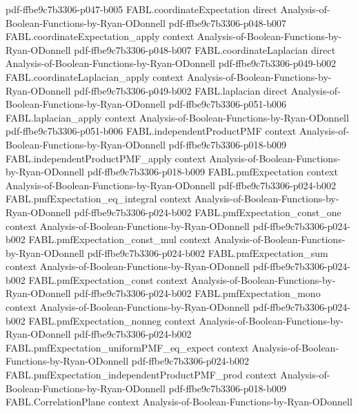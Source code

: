 \begin{theorem}
  {pdf-ffbe9c7b3306-p047-b005}
\proofstep
  {FABL.coordinateExpectation}
  {direct}
  {Analysis-of-Boolean-Functions-by-Ryan-ODonnell}
  {pdf-ffbe9c7b3306-p048-b007}
\proofstep
  {FABL.coordinateExpectation_apply}
  {context}
  {Analysis-of-Boolean-Functions-by-Ryan-ODonnell}
  {pdf-ffbe9c7b3306-p048-b007}
\proofstep
  {FABL.coordinateLaplacian}
  {direct}
  {Analysis-of-Boolean-Functions-by-Ryan-ODonnell}
  {pdf-ffbe9c7b3306-p049-b002}
\proofstep
  {FABL.coordinateLaplacian_apply}
  {context}
  {Analysis-of-Boolean-Functions-by-Ryan-ODonnell}
  {pdf-ffbe9c7b3306-p049-b002}
\proofstep
  {FABL.laplacian}
  {direct}
  {Analysis-of-Boolean-Functions-by-Ryan-ODonnell}
  {pdf-ffbe9c7b3306-p051-b006}
\proofstep
  {FABL.laplacian_apply}
  {context}
  {Analysis-of-Boolean-Functions-by-Ryan-ODonnell}
  {pdf-ffbe9c7b3306-p051-b006}
\proofstep
  {FABL.independentProductPMF}
  {context}
  {Analysis-of-Boolean-Functions-by-Ryan-ODonnell}
  {pdf-ffbe9c7b3306-p018-b009}
\proofstep
  {FABL.independentProductPMF_apply}
  {context}
  {Analysis-of-Boolean-Functions-by-Ryan-ODonnell}
  {pdf-ffbe9c7b3306-p018-b009}
\proofstep
  {FABL.pmfExpectation}
  {context}
  {Analysis-of-Boolean-Functions-by-Ryan-ODonnell}
  {pdf-ffbe9c7b3306-p024-b002}
\proofstep
  {FABL.pmfExpectation_eq_integral}
  {context}
  {Analysis-of-Boolean-Functions-by-Ryan-ODonnell}
  {pdf-ffbe9c7b3306-p024-b002}
\proofstep
  {FABL.pmfExpectation_const_one}
  {context}
  {Analysis-of-Boolean-Functions-by-Ryan-ODonnell}
  {pdf-ffbe9c7b3306-p024-b002}
\proofstep
  {FABL.pmfExpectation_const_mul}
  {context}
  {Analysis-of-Boolean-Functions-by-Ryan-ODonnell}
  {pdf-ffbe9c7b3306-p024-b002}
\proofstep
  {FABL.pmfExpectation_sum}
  {context}
  {Analysis-of-Boolean-Functions-by-Ryan-ODonnell}
  {pdf-ffbe9c7b3306-p024-b002}
\proofstep
  {FABL.pmfExpectation_const}
  {context}
  {Analysis-of-Boolean-Functions-by-Ryan-ODonnell}
  {pdf-ffbe9c7b3306-p024-b002}
\proofstep
  {FABL.pmfExpectation_mono}
  {context}
  {Analysis-of-Boolean-Functions-by-Ryan-ODonnell}
  {pdf-ffbe9c7b3306-p024-b002}
\proofstep
  {FABL.pmfExpectation_nonneg}
  {context}
  {Analysis-of-Boolean-Functions-by-Ryan-ODonnell}
  {pdf-ffbe9c7b3306-p024-b002}
\proofstep
  {FABL.pmfExpectation_uniformPMF_eq_expect}
  {context}
  {Analysis-of-Boolean-Functions-by-Ryan-ODonnell}
  {pdf-ffbe9c7b3306-p024-b002}
\proofstep
  {FABL.pmfExpectation_independentProductPMF_prod}
  {context}
  {Analysis-of-Boolean-Functions-by-Ryan-ODonnell}
  {pdf-ffbe9c7b3306-p018-b009}
\proofstep
  {FABL.CorrelationPlane}
  {context}
  {Analysis-of-Boolean-Functions-by-Ryan-ODonnell}

\end{theorem}
